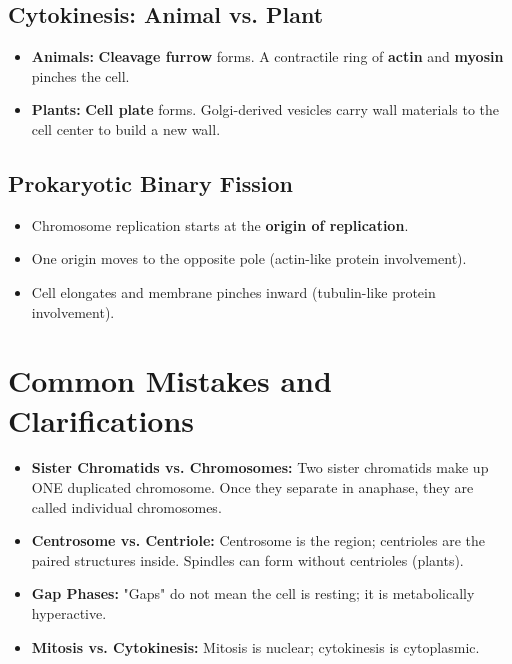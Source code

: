 \documentclass[11pt, a4paper]{article}
\begin{document}
\subsection*{Cytokinesis: Animal vs. Plant}
\begin{itemize}
    \item \textbf{Animals:} \textbf{Cleavage furrow} forms. A contractile ring of \textbf{actin} and \textbf{myosin} pinches the cell.
    \item \textbf{Plants:} \textbf{Cell plate} forms. Golgi-derived vesicles carry wall materials to the cell center to build a new wall.
\end{itemize}

\subsection*{Prokaryotic Binary Fission}
\begin{itemize}
    \item Chromosome replication starts at the \textbf{origin of replication}.
    \item One origin moves to the opposite pole (actin-like protein involvement).
    \item Cell elongates and membrane pinches inward (tubulin-like protein involvement).
\end{itemize}

\section*{Common Mistakes and Clarifications}
\begin{itemize}
    \item \textbf{Sister Chromatids vs. Chromosomes:} Two sister chromatids make up ONE duplicated chromosome. Once they separate in anaphase, they are called individual chromosomes.
    \item \textbf{Centrosome vs. Centriole:} Centrosome is the region; centrioles are the paired structures inside. Spindles can form without centrioles (plants).
    \item \textbf{Gap Phases:} "Gaps" do not mean the cell is resting; it is metabolically hyperactive.
    \item \textbf{Mitosis vs. Cytokinesis:} Mitosis is nuclear; cytokinesis is cytoplasmic.
\end{itemize}
\end{document}
